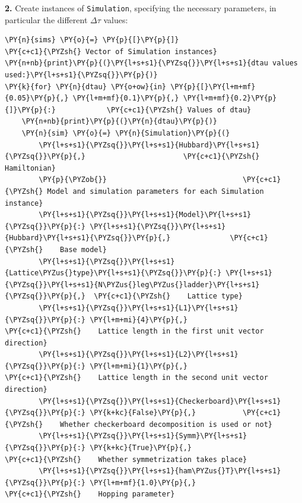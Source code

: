     \textbf{2.} Create instances of \texttt{Simulation}, specifying the
necessary parameters, in particular the different \(\Delta \tau\)
values:

    \begin{tcolorbox}[breakable, size=fbox, boxrule=1pt, pad at break*=1mm,colback=cellbackground, colframe=cellborder]
\begin{Verbatim}[commandchars=\\\{\}]
\PY{n}{sims} \PY{o}{=} \PY{p}{[}\PY{p}{]}                                \PY{c+c1}{\PYZsh{} Vector of Simulation instances}
\PY{n+nb}{print}\PY{p}{(}\PY{l+s+s1}{\PYZsq{}}\PY{l+s+s1}{dtau values used:}\PY{l+s+s1}{\PYZsq{}}\PY{p}{)}
\PY{k}{for} \PY{n}{dtau} \PY{o+ow}{in} \PY{p}{[}\PY{l+m+mf}{0.05}\PY{p}{,} \PY{l+m+mf}{0.1}\PY{p}{,} \PY{l+m+mf}{0.2}\PY{p}{]}\PY{p}{:}            \PY{c+c1}{\PYZsh{} Values of dtau}
    \PY{n+nb}{print}\PY{p}{(}\PY{n}{dtau}\PY{p}{)}
    \PY{n}{sim} \PY{o}{=} \PY{n}{Simulation}\PY{p}{(}
        \PY{l+s+s1}{\PYZsq{}}\PY{l+s+s1}{Hubbard}\PY{l+s+s1}{\PYZsq{}}\PY{p}{,}                       \PY{c+c1}{\PYZsh{} Hamiltonian}
        \PY{p}{\PYZob{}}                                \PY{c+c1}{\PYZsh{} Model and simulation parameters for each Simulation instance}
        \PY{l+s+s1}{\PYZsq{}}\PY{l+s+s1}{Model}\PY{l+s+s1}{\PYZsq{}}\PY{p}{:} \PY{l+s+s1}{\PYZsq{}}\PY{l+s+s1}{Hubbard}\PY{l+s+s1}{\PYZsq{}}\PY{p}{,}              \PY{c+c1}{\PYZsh{}    Base model}
        \PY{l+s+s1}{\PYZsq{}}\PY{l+s+s1}{Lattice\PYZus{}type}\PY{l+s+s1}{\PYZsq{}}\PY{p}{:} \PY{l+s+s1}{\PYZsq{}}\PY{l+s+s1}{N\PYZus{}leg\PYZus{}ladder}\PY{l+s+s1}{\PYZsq{}}\PY{p}{,}  \PY{c+c1}{\PYZsh{}    Lattice type}
        \PY{l+s+s1}{\PYZsq{}}\PY{l+s+s1}{L1}\PY{l+s+s1}{\PYZsq{}}\PY{p}{:} \PY{l+m+mi}{4}\PY{p}{,}                         \PY{c+c1}{\PYZsh{}    Lattice length in the first unit vector direction}
        \PY{l+s+s1}{\PYZsq{}}\PY{l+s+s1}{L2}\PY{l+s+s1}{\PYZsq{}}\PY{p}{:} \PY{l+m+mi}{1}\PY{p}{,}                         \PY{c+c1}{\PYZsh{}    Lattice length in the second unit vector direction}
        \PY{l+s+s1}{\PYZsq{}}\PY{l+s+s1}{Checkerboard}\PY{l+s+s1}{\PYZsq{}}\PY{p}{:} \PY{k+kc}{False}\PY{p}{,}           \PY{c+c1}{\PYZsh{}    Whether checkerboard decomposition is used or not}
        \PY{l+s+s1}{\PYZsq{}}\PY{l+s+s1}{Symm}\PY{l+s+s1}{\PYZsq{}}\PY{p}{:} \PY{k+kc}{True}\PY{p}{,}                    \PY{c+c1}{\PYZsh{}    Whether symmetrization takes place}
        \PY{l+s+s1}{\PYZsq{}}\PY{l+s+s1}{ham\PYZus{}T}\PY{l+s+s1}{\PYZsq{}}\PY{p}{:} \PY{l+m+mf}{1.0}\PY{p}{,}                    \PY{c+c1}{\PYZsh{}    Hopping parameter}

\end{Verbatim}
\end{tcolorbox}
